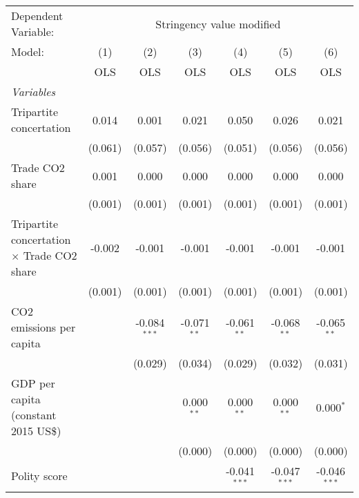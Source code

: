 
\begingroup
\centering
\begin{tabular}{lcccccc}
   \toprule
   Dependent Variable: & \multicolumn{6}{c}{Stringency value modified}\\
   Model:                                            & (1)     & (2)            & (3)           & (4)            & (5)            & (6)\\  
                                                     &  OLS    & OLS            & OLS           & OLS            & OLS            & OLS\\  
   \midrule
   \emph{Variables}\\
   Tripartite concertation                           & 0.014   & 0.001          & 0.021         & 0.050          & 0.026          & 0.021\\   
                                                     & (0.061) & (0.057)        & (0.056)       & (0.051)        & (0.056)        & (0.056)\\   
   Trade CO2 share                                   & 0.001   & 0.000          & 0.000         & 0.000          & 0.000          & 0.000\\   
                                                     & (0.001) & (0.001)        & (0.001)       & (0.001)        & (0.001)        & (0.001)\\   
   Tripartite concertation $\times$ Trade CO2 share  & -0.002  & -0.001         & -0.001        & -0.001         & -0.001         & -0.001\\   
                                                     & (0.001) & (0.001)        & (0.001)       & (0.001)        & (0.001)        & (0.001)\\   
   CO2 emissions per capita                          &         & -0.084$^{***}$ & -0.071$^{**}$ & -0.061$^{**}$  & -0.068$^{**}$  & -0.065$^{**}$\\   
                                                     &         & (0.029)        & (0.034)       & (0.029)        & (0.032)        & (0.031)\\   
   GDP per capita (constant 2015 US\$)               &         &                & 0.000$^{**}$  & 0.000$^{**}$   & 0.000$^{**}$   & 0.000$^{*}$\\   
                                                     &         &                & (0.000)       & (0.000)        & (0.000)        & (0.000)\\   
   Polity score                                      &         &                &               & -0.041$^{***}$ & -0.047$^{***}$ & -0.046$^{***}$\\   

\end{tabular}
